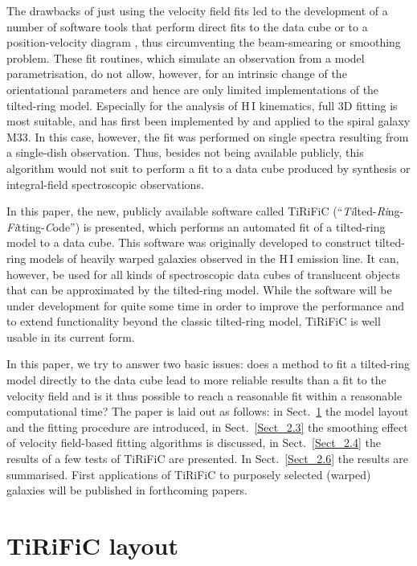 \documentclass[oldversion]{aa}
\newcommand{\cng}[1]{{#1}}
\begin{document}
The drawbacks of just using the velocity field fits led to the
development of a number of software tools that perform direct fits
to the data cube \citep[][]{Irwin91} or to a position-velocity
diagram \citep[][]{Simard99,Takamiya02,Boehm04}, thus circumventing the
beam-smearing or smoothing problem.  These fit routines, which simulate
an observation from a model parametrisation, do not allow,
however, for an intrinsic change of the orientational parameters and
hence are  only limited implementations of the tilted-ring model. 
Especially for the analysis of {H\,{\small I}} kinematics, full 3D
fitting is most suitable, and has first been implemented by
\citet[][]{Corbelli97} and applied to the spiral galaxy
M33.  In this case, however, the fit was performed on single spectra
resulting from a single-dish observation.  Thus, besides not being
available publicly, this algorithm would not suit to perform a fit to a
data cube produced by synthesis or integral-field spectroscopic
observations. 

In this paper, \cng{the} new, publicly available software called
TiRiFiC (``\emph{Ti}lted-\emph{Ri}ng-\emph{Fi}tting-\emph{C}ode'') is
presented, which performs an automated fit of a tilted-ring model to a
data cube.  This software was originally developed to construct
tilted-ring models of heavily warped galaxies observed in the
{H\,{\small I}} emission line.  It can, however, be used for all kinds of
spectroscopic data cubes of translucent objects that can be approximated
by the tilted-ring model.  While the software will be under development
for quite some time in order to improve the performance and to 
extend functionality beyond the classic tilted-ring model,
TiRiFiC is well usable in its current form. 

In this paper, we try to answer two basic issues: does a method to
fit a tilted-ring model directly to the data cube lead to more reliable
results than a fit to the velocity field and is it thus possible to
reach a reasonable fit within a reasonable computational time?
The paper
is laid out as follows: in Sect.~\ref{Sect_2.2} the model layout and
the fitting procedure are introduced, in Sect.~\ref{Sect_2.3} the
smoothing effect of velocity field-based fitting algorithms is
discussed, in Sect.~\ref{Sect_2.4} the results of \cng{a few tests}
of TiRiFiC \cng{are} presented. 
In Sect.~\ref{Sect_2.6}
the results are summarised. First applications of TiRiFiC to purposely selected (warped) galaxies will be published in forthcoming papers.
\section{TiRiFiC layout}
\label{Sect_2.2}
\end{document}
